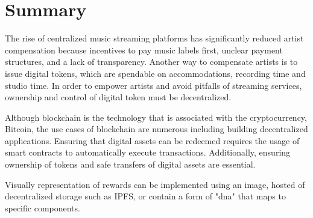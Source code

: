   \section*{Summary } 
  The rise of centralized music streaming platforms has significantly reduced artist compensation because incentives to pay music labels first, unclear payment structures, and a lack of transparency. Another way to compensate artists is to issue digital tokens, which are spendable on accommodations, recording time and studio time. In order to empower artists and avoid pitfalls of streaming services, ownership and control of digital token must be decentralized. %
   
   Although \gls{blockchain} is the technology that is associated with the cryptocurrency, Bitcoin, the use cases of blockchain are numerous including building decentralized applications. Ensuring that digital assets can be redeemed requires the usage of \glspl{smart contract} to automatically execute transactions. Additionally, ensuring ownership of tokens and safe transfers of digital assets are essential.
   
   Visually representation of rewards can be implemented using an image, hosted of decentralized storage such as IPFS, or contain a form of "dna" that maps to specific components.
